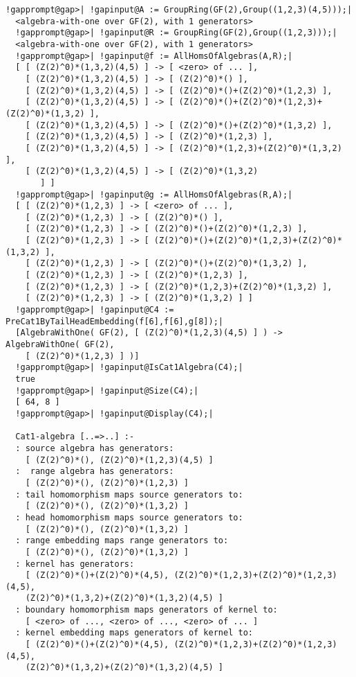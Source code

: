 \documentclass[a4paper,11pt]{report}
\begin{document}
{{\begin{Verbatim}[commandchars=!@|,fontsize=\small,frame=single,label=Example]
  !gapprompt@gap>| !gapinput@A := GroupRing(GF(2),Group((1,2,3)(4,5)));|
  <algebra-with-one over GF(2), with 1 generators>
  !gapprompt@gap>| !gapinput@R := GroupRing(GF(2),Group((1,2,3)));|
  <algebra-with-one over GF(2), with 1 generators>
  !gapprompt@gap>| !gapinput@f := AllHomsOfAlgebras(A,R);|
  [ [ (Z(2)^0)*(1,3,2)(4,5) ] -> [ <zero> of ... ], 
    [ (Z(2)^0)*(1,3,2)(4,5) ] -> [ (Z(2)^0)*() ],
    [ (Z(2)^0)*(1,3,2)(4,5) ] -> [ (Z(2)^0)*()+(Z(2)^0)*(1,2,3) ],
    [ (Z(2)^0)*(1,3,2)(4,5) ] -> [ (Z(2)^0)*()+(Z(2)^0)*(1,2,3)+(Z(2)^0)*(1,3,2) ],
    [ (Z(2)^0)*(1,3,2)(4,5) ] -> [ (Z(2)^0)*()+(Z(2)^0)*(1,3,2) ], 
    [ (Z(2)^0)*(1,3,2)(4,5) ] -> [ (Z(2)^0)*(1,2,3) ],
    [ (Z(2)^0)*(1,3,2)(4,5) ] -> [ (Z(2)^0)*(1,2,3)+(Z(2)^0)*(1,3,2) ], 
    [ (Z(2)^0)*(1,3,2)(4,5) ] -> [ (Z(2)^0)*(1,3,2)
       ] ]
  !gapprompt@gap>| !gapinput@g := AllHomsOfAlgebras(R,A);|
  [ [ (Z(2)^0)*(1,2,3) ] -> [ <zero> of ... ], 
    [ (Z(2)^0)*(1,2,3) ] -> [ (Z(2)^0)*() ],
    [ (Z(2)^0)*(1,2,3) ] -> [ (Z(2)^0)*()+(Z(2)^0)*(1,2,3) ],
    [ (Z(2)^0)*(1,2,3) ] -> [ (Z(2)^0)*()+(Z(2)^0)*(1,2,3)+(Z(2)^0)*(1,3,2) ],
    [ (Z(2)^0)*(1,2,3) ] -> [ (Z(2)^0)*()+(Z(2)^0)*(1,3,2) ], 
    [ (Z(2)^0)*(1,2,3) ] -> [ (Z(2)^0)*(1,2,3) ],
    [ (Z(2)^0)*(1,2,3) ] -> [ (Z(2)^0)*(1,2,3)+(Z(2)^0)*(1,3,2) ], 
    [ (Z(2)^0)*(1,2,3) ] -> [ (Z(2)^0)*(1,3,2) ] ]
  !gapprompt@gap>| !gapinput@C4 := PreCat1ByTailHeadEmbedding(f[6],f[6],g[8]);|
  [AlgebraWithOne( GF(2), [ (Z(2)^0)*(1,2,3)(4,5) ] ) -> AlgebraWithOne( GF(2), 
    [ (Z(2)^0)*(1,2,3) ] )]
  !gapprompt@gap>| !gapinput@IsCat1Algebra(C4);|
  true
  !gapprompt@gap>| !gapinput@Size(C4);|
  [ 64, 8 ]
  !gapprompt@gap>| !gapinput@Display(C4);|
  
  Cat1-algebra [..=>..] :-
  : source algebra has generators:
    [ (Z(2)^0)*(), (Z(2)^0)*(1,2,3)(4,5) ]
  :  range algebra has generators:
    [ (Z(2)^0)*(), (Z(2)^0)*(1,2,3) ]
  : tail homomorphism maps source generators to:
    [ (Z(2)^0)*(), (Z(2)^0)*(1,3,2) ]
  : head homomorphism maps source generators to:
    [ (Z(2)^0)*(), (Z(2)^0)*(1,3,2) ]
  : range embedding maps range generators to:
    [ (Z(2)^0)*(), (Z(2)^0)*(1,3,2) ]
  : kernel has generators:
    [ (Z(2)^0)*()+(Z(2)^0)*(4,5), (Z(2)^0)*(1,2,3)+(Z(2)^0)*(1,2,3)(4,5), 
    (Z(2)^0)*(1,3,2)+(Z(2)^0)*(1,3,2)(4,5) ]
  : boundary homomorphism maps generators of kernel to:
    [ <zero> of ..., <zero> of ..., <zero> of ... ]
  : kernel embedding maps generators of kernel to:
    [ (Z(2)^0)*()+(Z(2)^0)*(4,5), (Z(2)^0)*(1,2,3)+(Z(2)^0)*(1,2,3)(4,5), 
    (Z(2)^0)*(1,3,2)+(Z(2)^0)*(1,3,2)(4,5) ]
  

\end{Verbatim}}}
\end{document}
